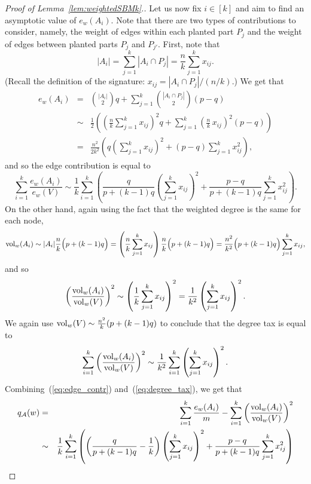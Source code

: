 \documentclass[a4paper,UKenglish,cleveref, autoref, thm-restate,numberwithinsect]{lipics-v2021}
\newcommand{\cA}{\mathcal{A}}
\newcommand{\vol}{{\rm vol}}
\begin{document}
\begin{proof}[Proof of Lemma~\ref{lem:weightedSBMk}.]
Let us now fix $i \in [k]$ and aim to find an asymptotic value of $e_w(A_i)$. Note that there are two types of contributions to consider, namely, the weight of edges within each planted part $P_j$ and the weight of edges between planted parts $P_j$ and $P_{j'}$. First, note that
$$
|A_i| = \sum_{j=1}^k |A_i \cap P_j| = \frac {n}{k} \sum_{j=1}^k x_{ij}.
$$
(Recall the definition of the signature: $x_{ij} = |A_i \cap P_j| / (n/k)$.) We get that
\begin{eqnarray*}
e_w (A_i) &=& \binom{|A_i|}{2} q + \sum_{j=1}^k \binom{|A_i \cap P_j|}{2} (p-q) \\
&\sim& \frac {1}{2} \left( \left( \frac {n}{k} \sum_{j=1}^k x_{ij} \right)^2 q + \sum_{j=1}^k \left( \frac {n}{k} \, x_{ij} \right)^2 (p-q) \right) \\
&=& \frac {n^2}{2k^2} \left( q \left( \sum_{j=1}^k x_{ij} \right)^2 + (p-q) \sum_{j=1}^k x_{ij}^2 \right), 
\end{eqnarray*}
and so the edge contribution is equal to 
\begin{equation}\label{eq:edge_contr}
\sum_{i=1}^k \frac {e_w (A_i)}{e_w(V)} \sim \frac {1}{k} \sum_{i=1}^k \left( \frac {q}{p+(k-1)q} \left( \sum_{j=1}^k x_{ij} \right)^2 + \frac {p-q}{p+(k-1)q} \sum_{j=1}^k x_{ij}^2 \right).
\end{equation}
%
On the other hand, again using the fact that the weighted degree is the same for each node, 
$$
\vol_w(A_i) \sim |A_i| \frac {n}{k} \Big( p+(k-1)q \Big) = \left( \frac {n}{k} \sum_{j=1}^k x_{ij} \right) \frac {n}{k} \Big( p+(k-1)q \Big) = \frac {n^2}{k^2} \Big( p+(k-1)q \Big) \sum_{j=1}^k x_{ij},
$$
and so 
$$
\left( \frac {\vol_w(A_i)}{\vol_w(V)} \right)^2 \sim \left( \frac {1}{k} \sum_{j=1}^k x_{ij} \right)^2 = \frac {1}{k^2} \left( \sum_{j=1}^k x_{ij} \right)^2.
$$
We again use $\vol_w(V) \sim \frac {n^2}{k} ( p+(k-1)q )$ to conclude that the degree tax is equal to
\begin{equation}\label{eq:degree_tax}
\sum_{i=1}^k \left( \frac {\vol_w(A_i)}{\vol_w(V)} \right)^2 \sim \frac {1}{k^2} \sum_{i=1}^k \left( \sum_{j=1}^k x_{ij} \right)^2.
\end{equation}
%
Combining~(\ref{eq:edge_contr}) and~(\ref{eq:degree_tax}), we get that
\begin{eqnarray}
q_\cA(w) &=& \sum_{i=1}^k \frac {e_w (A_i)}{m} - \sum_{i=1}^k \left( \frac {\vol_w(A_i)}{\vol_w(V)} \right)^2 \nonumber \\
&\sim& \frac {1}{k} \sum_{i=1}^k \left( \left( \frac {q}{p+(k-1)q} - \frac {1}{k} \right) \left( \sum_{j=1}^k x_{ij} \right)^2 + \frac {p-q}{p+(k-1)q} \sum_{j=1}^k x_{ij}^2 \right) \nonumber \\

\end{eqnarray}
\end{proof}
\end{document}
